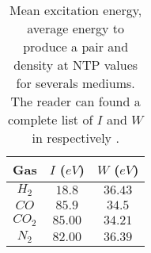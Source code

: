 \begin{table}[ht]
	\centering
	\caption[Mean excitation energie, average energy to produce a pair and density at NTP  values for severals mediums]
	{Mean excitation energy, average energy to produce a pair and density at NTP  values for severals mediums. The reader can found a complete list of \(I\) and \(W\) in respectively \cite{Kamakura2006}\cite{Bichsel1979}.}
	\label{chap3:WandI}
	\begin{tabular}{ccc}
		\toprule
		Gas        & \(I\) (\(eV\)) & \(W\) (\(eV\)) \\
		\midrule
		\(H_{2}\)  & \(18.8\)       & \(36.43\)      \\
		\(CO\)     & \(85.9\)       & \(34.5\)       \\
		\(CO_{2}\) & \(85.00\)      & \(34.21\)      \\
		\(N_{2}\)  & \(82.00\)      & \(36.39\)      \\
		\bottomrule
	\end{tabular}
\end{table}